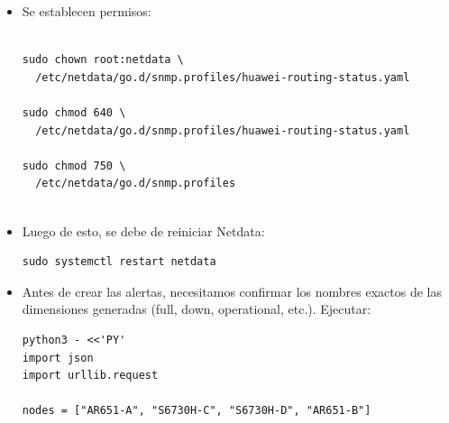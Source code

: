 \begin{itemize}
\begin{lstlisting}[style=terminal]
    symbols:
      - OID: 1.3.6.1.2.1.10.166.4.1.3.3.1.2
        name: mplsLdpSessionState
        metric_type: gauge

        chart_meta:
          description: Estado de la sesi\'on MPLS LDP
          family: "Routing/MPLS/LDP Sessions"
          unit: "state"

        mapping:
          items:
            1: nonexistent
            2: initialized
            3: openrec
            4: opensent
            5: operational

    metric_tags:
      - tag: peer
        symbol:
          name: mplsLdpPeerAddress
          format: ip_address
        index_transform:
          - start: 7
            drop_right: 2
\end{lstlisting}

Netdata exige que las métricas provenientes de tablas tengan al menos una etiqueta que identifique cada fila. Aquí las etiquetas neighbor y peer se extraen del índice del OID, en lugar de consultar otra columna SNMP. El mapping convierte los números en dimensiones legibles, como full, down y operational. \cite{netdata1almacenamiento}


\item Se establecen permisos:

\begin{lstlisting}[style=terminal]

sudo chown root:netdata \
  /etc/netdata/go.d/snmp.profiles/huawei-routing-status.yaml

sudo chmod 640 \
  /etc/netdata/go.d/snmp.profiles/huawei-routing-status.yaml

sudo chmod 750 \
  /etc/netdata/go.d/snmp.profiles


  \end{lstlisting}


\item Luego de esto, se debe de reiniciar Netdata:
\begin{lstlisting}[style=terminal]
sudo systemctl restart netdata
 \end{lstlisting}

\item Antes de crear las alertas, necesitamos confirmar los nombres exactos de las dimensiones generadas (full, down, operational, etc.). Ejecutar:
 \begin{lstlisting}[style=terminal]
python3 - <<'PY'
import json
import urllib.request

nodes = ["AR651-A", "S6730H-C", "S6730H-D", "AR651-B"]


\end{lstlisting}
\end{itemize}
